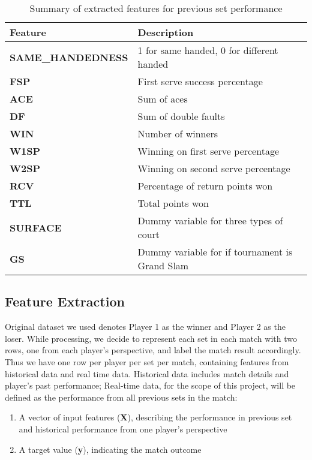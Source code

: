 \documentclass[paper=a4, fontsize=11pt]{scrartcl} %
\numberwithin{equation}{section} %
\numberwithin{figure}{section} %
\numberwithin{table}{section} %
\begin{document}
\begin{center}
\begin{table}[h]
    \begin{tabular}{  l | p{3cm} }
    \hline
    Feature  & Description \\ \hline
    \textbf{SAME\_HANDEDNESS}  & 1 for same handed, 0 for different handed \\ \hline
    \textbf{FSP}  & First serve success percentage \\ \hline
    \textbf{ACE}  & Sum of aces \\ \hline
    \textbf{DF}  & Sum of double faults \\ \hline
    \textbf{WIN}  & Number of winners \\ \hline
    \textbf{W1SP}  & Winning on first serve percentage \\ \hline
    \textbf{W2SP}  & Winning on second serve percentage \\ \hline
    \textbf{RCV}  & Percentage of return points won \\ \hline
    \textbf{TTL}  & Total points won \\ \hline
    \textbf{SURFACE}  & Dummy variable for three types of court\\ \hline
    \textbf{GS} & Dummy variable for if tournament is Grand Slam \\ \hline    
    \end{tabular}
    \caption{Summary of extracted features for previous set performance}
    \label{tab:features2}
    \end{table}
\end{center}
\subsection{Feature Extraction}
\label{sec:label}
Original dataset we used denotes Player 1 as the winner and Player 2 as the loser. While processing, we decide to represent each set in each match with two rows, one from each player's perspective, and label the match result accordingly. Thus we have one row per player per set per match, containing features from historical data and real time data. Historical data includes match details and player's past performance; Real-time data, for the scope of this project, will be defined as the performance from all previous sets in the match:
\begin{enumerate}
\item A vector of input features (\textbf{X}), describing the performance in previous set and historical performance from one player's perspective
\item A target value (\textbf{y}), indicating the match outcome
\end{enumerate}
\end{document}
